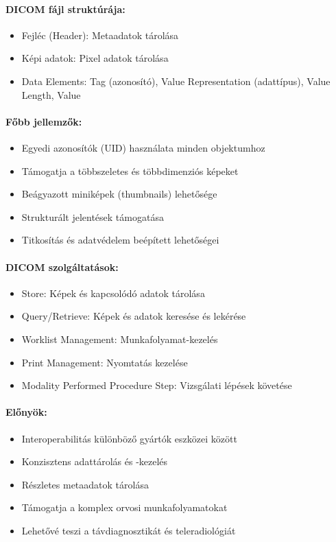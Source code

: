 \documentclass[a4paper,12pt]{article}
\begin{document}
\paragraph{DICOM fájl struktúrája:} \begin{itemize} \item Fejléc (Header): Metaadatok tárolása \item Képi adatok: Pixel adatok tárolása \item Data Elements: Tag (azonosító), Value Representation (adattípus), Value Length, Value \end{itemize}

\paragraph{Főbb jellemzők:} \begin{itemize} \item Egyedi azonosítók (UID) használata minden objektumhoz \item Támogatja a többszeletes és többdimenziós képeket \item Beágyazott miniképek (thumbnails) lehetősége \item Strukturált jelentések támogatása \item Titkosítás és adatvédelem beépített lehetőségei \end{itemize}

\paragraph{DICOM szolgáltatások:} \begin{itemize} \item Store: Képek és kapcsolódó adatok tárolása \item Query/Retrieve: Képek és adatok keresése és lekérése \item Worklist Management: Munkafolyamat-kezelés \item Print Management: Nyomtatás kezelése \item Modality Performed Procedure Step: Vizsgálati lépések követése \end{itemize}

\paragraph{Előnyök:} \begin{itemize} \item Interoperabilitás különböző gyártók eszközei között \item Konzisztens adattárolás és -kezelés \item Részletes metaadatok tárolása \item Támogatja a komplex orvosi munkafolyamatokat \item Lehetővé teszi a távdiagnosztikát és teleradiológiát \end{itemize}
\end{document}
